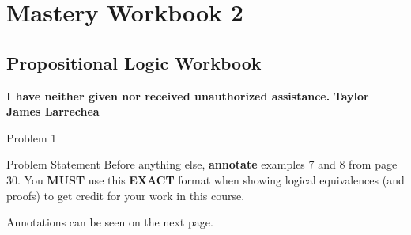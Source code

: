\clearpage
\chapter{Mastery Workbook 2}

\section{Propositional Logic Workbook}


\begin{center}
    \Large{\textbf{I have neither given nor received unauthorized assistance.}}
    \large{\textbf{Taylor James Larrechea}}
\end{center}

\begin{problem}{Problem 1}
    \begin{statement}{Problem Statement}
        Before anything else, \textbf{annotate} examples 7 and 8 from page 30. You \textbf{MUST} use this \textbf{EXACT} format when showing logical equivalences (and proofs) to get credit for your work 
        in this course.
    \end{statement}

    Annotations can be seen on the next page.

    
\end{problem}

